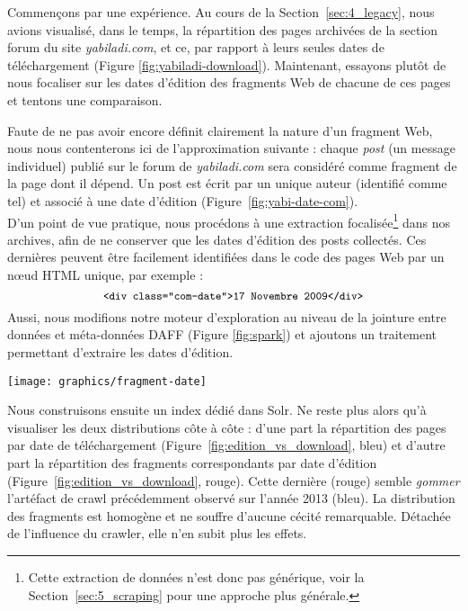 \documentclass[symmetric,justified,marginals=raggedouter]{tufte-book}
\begin{document}
\noindent Commençons par une expérience. Au cours de la Section~\ref{sec:4_legacy}, nous avions visualisé, dans le temps, la répartition des pages archivées de la section forum du site \textit{yabiladi.com}, et ce, par rapport à leurs seules dates de téléchargement (Figure \ref{fig:yabiladi-download}). Maintenant, essayons plutôt de nous focaliser sur les dates d'édition des fragments Web de chacune de ces pages et tentons une comparaison. 

Faute de ne pas avoir encore définit clairement la nature d'un fragment Web, nous nous contenterons ici de l'approximation suivante : chaque \textit{post} (un message individuel) publié sur le forum de \textit{yabiladi.com} sera considéré comme fragment de la page dont il dépend. Un post est écrit par un unique auteur (identifié comme tel) et associé à une date d'édition (Figure~\ref{fig:yabi-date-com}). \\

\noindent D'un point de vue pratique, nous procédons à une extraction focalisée\footnote{\RaggedOuter Cette extraction de données n'est donc pas générique, voir la Section~\ref{sec:5_scraping} pour une approche plus générale.} dans nos archives, afin de ne conserver que les dates d'édition des posts collectés. Ces dernières peuvent être facilement identifiées dans le code des pages Web par un nœud HTML unique, par exemple :
\[
\small
\texttt{<div class="com-date">17 Novembre 2009</div>}
\]
\noindent Aussi, nous modifions notre moteur d'exploration au niveau de la jointure entre données et méta-données DAFF (Figure \ref{fig:spark}) et ajoutons un traitement permettant d'extraire les dates d'édition.

\begin{figure*}%
  \texttt{[image: graphics/fragment-date]}
  \caption{Distribution, pour \textit{yabiladi.com}, du nombre de pages et de fragments archivés par jours et suivant leurs dates de téléchargement (bleu) et d'édition (rouge) respectives}
  \label{fig:edition_vs_download}
\end{figure*}

\noindent Nous construisons ensuite un index dédié dans Solr. Ne reste plus alors qu'à visualiser les deux distributions côte à côte : d'une part la répartition des pages par date de téléchargement (Figure~\ref{fig:edition_vs_download}, bleu) et d'autre part la répartition des fragments correspondants par date d'édition (Figure~\ref{fig:edition_vs_download}, rouge). Cette dernière (rouge) semble \textit{gommer} l'artéfact de crawl précédemment observé sur l'année 2013 (bleu). La distribution des fragments est homogène et ne souffre d'aucune cécité remarquable. Détachée de l'influence du crawler, elle n'en subit plus les effets. 
\end{document}
